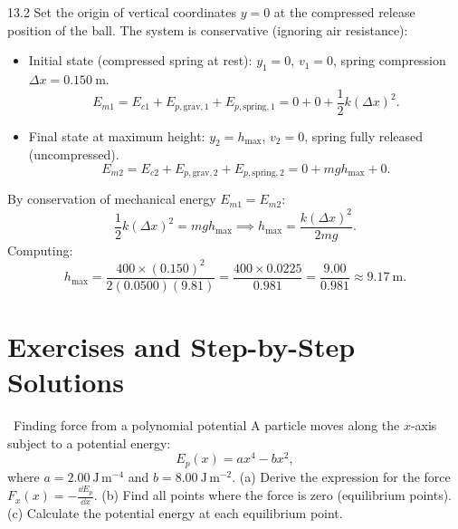 \begin{solution}{13.2}
Set the origin of vertical coordinates $y = 0$ at the compressed release position of the ball.
The system is conservative (ignoring air resistance):
\begin{itemize}[leftmargin=1.4em,itemsep=2pt]
  \item Initial state (compressed spring at rest): $y_1 = 0$, $v_1 = 0$, spring compression $\Delta x = 0.150\ \mathrm{m}$.
  \[
  E_{m1} = E_{c1} + E_{p,\text{grav},1} + E_{p,\text{spring},1} = 0 + 0 + \frac{1}{2}k(\Delta x)^2.
  \]
  \item Final state at maximum height: $y_2 = h_{\max}$, $v_2 = 0$, spring fully released (uncompressed).
  \[
  E_{m2} = E_{c2} + E_{p,\text{grav},2} + E_{p,\text{spring},2} = 0 + mg h_{\max} + 0.
  \]
\end{itemize}
By conservation of mechanical energy $E_{m1} = E_{m2}$:
\[
\frac{1}{2}k(\Delta x)^2 = mg h_{\max} \implies \boxed{h_{\max} = \frac{k(\Delta x)^2}{2mg}.}
\]
Computing:
\[
h_{\max} = \frac{400\times (0.150)^2}{2(0.0500)(9.81)} = \frac{400\times 0.0225}{0.981} = \frac{9.00}{0.981} \approx \mathbf{9.17\ \mathrm{m}.}
\]
\end{solution}

\section{Exercises and Step-by-Step Solutions}

\begin{exercise}{\warm\ Finding force from a polynomial potential}
A particle moves along the $x$-axis subject to a potential energy:
\[
E_p(x) = ax^4 - bx^2,
\]
where $a = 2.00\ \mathrm{J\,m^{-4}}$ and $b = 8.00\ \mathrm{J\,m^{-2}}$.
(a) Derive the expression for the force $F_x(x) = -\frac{\dd E_p}{\dd x}$.
(b) Find all points where the force is zero (equilibrium points).
(c) Calculate the potential energy at each equilibrium point.
\end{exercise}

\begin{tabletworkspace}[5.0cm]
\end{tabletworkspace}

